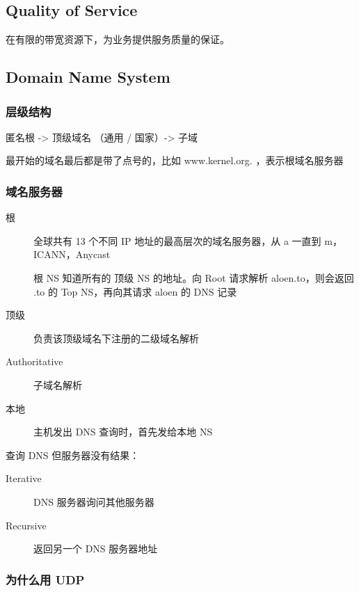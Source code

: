 \documentclass[11pt,journal,compsoc]{IEEEtran}
\begin{document}
\subsection{Quality of Service}

在有限的带宽资源下，为业务提供服务质量的保证。




\subsection{Domain Name System}


\subsubsection{层级结构}

匿名根 -> 顶级域名 （通用 / 国家）-> 子域

最开始的域名最后都是带了点号的，比如 www.kernel.org. ，表示根域名服务器


\subsubsection{域名服务器}

\begin{description}
    \item[根] 全球共有 13 个不同 IP 地址的最高层次的域名服务器，从 a 一直到 m，ICANN，Anycast

    根 NS 知道所有的 顶级 NS 的地址。向 Root 请求解析 aloen.to，则会返回 .to 的 Top NS，再向其请求 aloen 的 DNS 记录

    \item[顶级] 负责该顶级域名下注册的二级域名解析

    \item[Authoritative] 子域名解析

    \item[本地] 主机发出 DNS 查询时，首先发给本地 NS
\end{description}

查询 DNS 但服务器没有结果：

\begin{description}
    \item[Iterative] DNS 服务器询问其他服务器
    \item[Recursive] 返回另一个 DNS 服务器地址
\end{description}


\subsubsection{为什么用 UDP}
\end{document}
